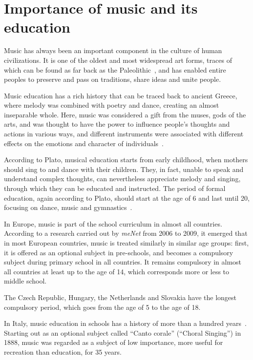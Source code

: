 \section{Importance of music and its education}\label{sec:importance-of-music-and-its-education}
Music has always been an important component in the culture of human civilizations.
It is one of the oldest and most widespread art forms,
traces of which can be found as far back as the Paleolithic~\cite{origin-of-music},
and has enabled entire peoples to preserve and pass on traditions, share ideas and unite people.

Music education has a rich history that can be traced back to ancient Greece,
where melody was combined with poetry and dance, creating an almost inseparable whole.
Here, music was considered a gift from the muses, gods of the arts, and was thought to have the power
to influence people's thoughts and actions in various ways, and different instruments were associated with different
effects on the emotions and character of individuals~\cite{music-education-in-ancient-greece}.

According to Plato, musical education starts from early childhood,
when mothers should sing to and dance with their children.
They, in fact, unable to speak and understand complex thoughts, can nevertheless appreciate melody and singing,
through which they can be educated and instructed.
The period of formal education, again according to Plato, should start at the age of 6 and last until 20,
focusing on dance, music and gymnastics~\cite{music-education-in-ancient-greece}.

In Europe, music is part of the school curriculum in almost all countries.
According to a research carried out by \textit{meNet} from 2006 to 2009, it emerged that in most European countries,
music is treated similarly in similar age groups: first, it is offered as an optional subject in pre-schools,
and becomes a compulsory subject during primary school in all countries.
It remains compulsory in almost all countries at least up to the age of 14, which corresponds more or less to middle school.

The Czech Republic, Hungary, the Netherlands and Slovakia have the longest compulsory period,
which goes from the age of 5 to the age of 18.

In Italy, music education in schools has a history of more than a hundred years~\cite{storia-educazione-musica}.
Starting out as an optional subject called ``Canto corale'' (``Choral Singing'') in 1888,
music was regarded as a subject of low importance, more useful for recreation than education, for 35 years.

